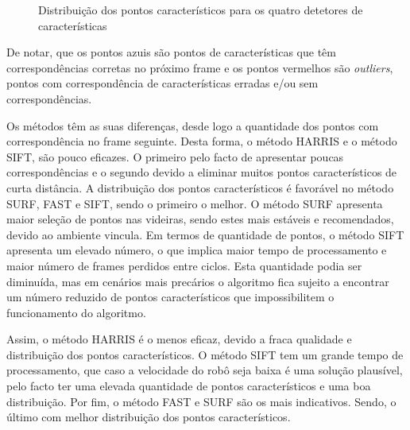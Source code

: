 

\begin{figure}[h!]
	\centering
	\qquad

	\qquad
	\caption{Distribuição dos pontos característicos para os quatro detetores de características}\label{fig:metodosALL}
\end{figure}


De notar, que os pontos azuis são pontos de características que têm correspondências corretas no próximo frame e os pontos vermelhos são \textit{outliers}, pontos com correspondência de características erradas e/ou sem correspondências.

Os métodos têm as suas diferenças, desde logo a quantidade dos pontos com correspondência no frame seguinte. Desta forma, o método HARRIS e o método SIFT, são pouco eficazes. O primeiro pelo facto de apresentar poucas correspondências e o segundo devido a eliminar muitos pontos característicos de curta distância. A distribuição dos pontos característicos é favorável no método SURF, FAST e SIFT, sendo o primeiro o melhor. O método SURF apresenta maior seleção de pontos nas videiras, sendo estes mais estáveis e recomendados, devido ao ambiente vincula. Em termos de quantidade de pontos, o método SIFT apresenta um elevado número, o que implica maior tempo de processamento e maior número de frames perdidos entre ciclos. Esta quantidade podia ser diminuída, mas em cenários mais precários o algoritmo fica sujeito a encontrar um número reduzido de pontos característicos que impossibilitem o funcionamento do algoritmo. 

Assim, o método HARRIS é o menos eficaz, devido a fraca qualidade e distribuição dos pontos característicos. O método SIFT tem um grande tempo de processamento, que caso a velocidade do robô seja baixa é uma solução plausível, pelo facto ter uma elevada quantidade de pontos característicos e uma boa distribuição. Por fim, o método FAST e SURF são os mais indicativos. Sendo, o último com melhor distribuição  dos pontos característicos. 


